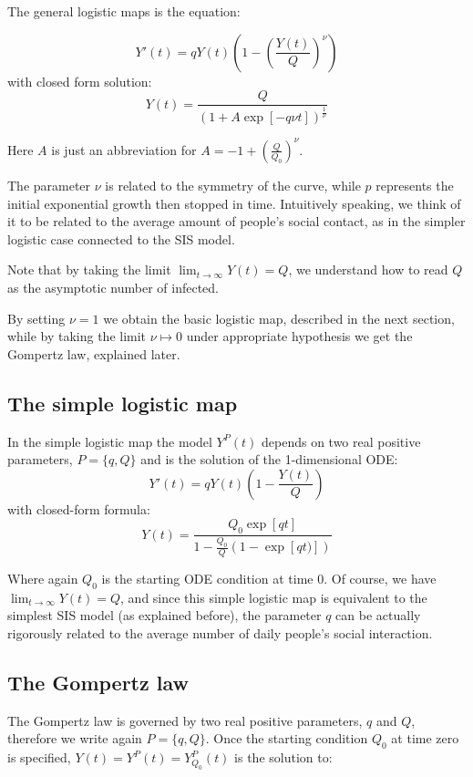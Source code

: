 \documentclass[9pt]{article}
\begin{document}
The general logistic maps is the equation:

\begin{equation}
	Y'(t) = q Y(t) 
	\left ( 1 - \left( \frac{Y(t)}{Q} \right)^{\nu}\right )
\end{equation}
with closed form solution:
\begin{equation}
	Y(t) = \frac{Q} { (1 + A \exp[-q \nu t])^{\frac{1}{\nu}}}
\end{equation}

Here $A$ is just an abbreviation  for
$A = -1 + \left ( \frac{Q} { Q_0} \right )^{\nu}$.


The parameter $\nu$ is related to the symmetry of the curve,
while $p$ represents the initial exponential growth then stopped
in time. Intuitively speaking, we think of it to be related to the
average amount of people's social contact, as in the simpler logistic case
connected to the SIS model.


Note that by taking the limit $\lim_{t \to \infty} Y(t) = Q$, 
we understand how to read $Q$ as the asymptotic number of infected.


By setting $\nu = 1$ we obtain the basic logistic map, described
in the next section, while by taking the limit $\nu \mapsto 0$ 
under appropriate
hypothesis we get the Gompertz law, explained later.



\subsection {The simple logistic map}
In the simple logistic map the model $Y^P(t)$ depends on two real positive
parameters, $P = \{ q, Q \}$ and is the solution of the 1-dimensional ODE:
\begin{equation}
	Y'(t)  = q Y(t) \left ( 1 - \frac{Y(t)}{Q} \right )
\end{equation}
with closed-form formula:
\begin{equation}
Y(t) = \frac{Q_0 \exp[q t]}
	{1-\frac{Q_0}{Q} (1-\exp[q t)])}
\end{equation}


Where again $Q_0$ is the starting ODE condition at time $0$.
Of course, we have $\lim_{t \to \infty} Y(t) = Q$,
and since this simple logistic map is equivalent to the simplest SIS
model (as explained before), the parameter $q$ can be actually
rigorously related to the average number of daily people's social interaction.


\subsection{The Gompertz law}
The Gompertz law is governed by two real positive parameters,
$q$ and $Q$, therefore we write again $P = \{q, Q\}$.
Once the starting condition $Q_0$ at time zero
is specified, $Y(t) = Y^P(t) = Y_{Q_0}^P(t)$ is the solution to:
\end{document}
